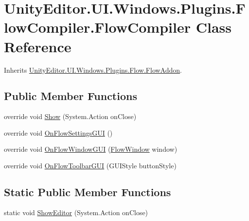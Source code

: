 \hypertarget{class_unity_editor_1_1_u_i_1_1_windows_1_1_plugins_1_1_flow_compiler_1_1_flow_compiler}{}\section{Unity\+Editor.\+U\+I.\+Windows.\+Plugins.\+Flow\+Compiler.\+Flow\+Compiler Class Reference}
\label{class_unity_editor_1_1_u_i_1_1_windows_1_1_plugins_1_1_flow_compiler_1_1_flow_compiler}


Inherits \hyperlink{class_unity_editor_1_1_u_i_1_1_windows_1_1_plugins_1_1_flow_1_1_flow_addon}{Unity\+Editor.\+U\+I.\+Windows.\+Plugins.\+Flow.\+Flow\+Addon}.

\subsection*{Public Member Functions}
\begin{DoxyCompactItemize}
\item 
override void \hyperlink{class_unity_editor_1_1_u_i_1_1_windows_1_1_plugins_1_1_flow_compiler_1_1_flow_compiler_a7bbe37ce600a45af8cdc34a608537d23}{Show} (System.\+Action on\+Close)
\item 
override void \hyperlink{class_unity_editor_1_1_u_i_1_1_windows_1_1_plugins_1_1_flow_compiler_1_1_flow_compiler_a3d796d80c5dbfb00f3cda0163a21b147}{On\+Flow\+Settings\+G\+U\+I} ()
\item 
override void \hyperlink{class_unity_editor_1_1_u_i_1_1_windows_1_1_plugins_1_1_flow_compiler_1_1_flow_compiler_a468e9314695817ca45538dcc6dd693eb}{On\+Flow\+Window\+G\+U\+I} (\hyperlink{class_unity_engine_1_1_u_i_1_1_windows_1_1_plugins_1_1_flow_1_1_flow_window}{Flow\+Window} window)
\item 
override void \hyperlink{class_unity_editor_1_1_u_i_1_1_windows_1_1_plugins_1_1_flow_compiler_1_1_flow_compiler_a99f26b2f026697b397ccf1d8704cb170}{On\+Flow\+Toolbar\+G\+U\+I} (G\+U\+I\+Style button\+Style)
\end{DoxyCompactItemize}
\subsection*{Static Public Member Functions}
\begin{DoxyCompactItemize}
\item 
static void \hyperlink{class_unity_editor_1_1_u_i_1_1_windows_1_1_plugins_1_1_flow_compiler_1_1_flow_compiler_a023a85439fab87842a42fc57a4fe0a17}{Show\+Editor} (System.\+Action on\+Close)
\end{DoxyCompactItemize}

